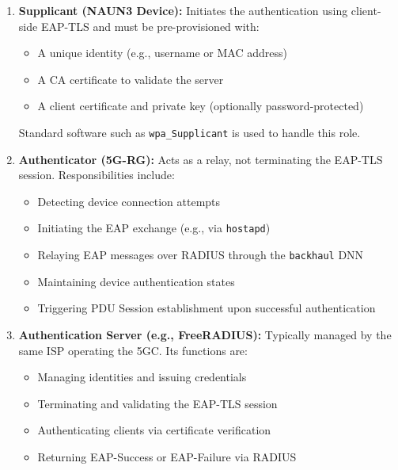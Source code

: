 \begin{enumerate}
    \item {
        \textbf{Supplicant (NAUN3 Device):} Initiates the authentication using client-side \ac{EAP-TLS} and must be pre-provisioned with:
        \begin{itemize}
            \item A unique identity (e.g., username or \ac{MAC} address)
            \item A \ac{CA} certificate to validate the server
            \item A client certificate and private key (optionally password-protected)
        \end{itemize}
        Standard software such as \texttt{wpa\_Supplicant} is used to handle this role.
    }
    \item {
        \textbf{Authenticator (5G-RG):} Acts as a relay, not terminating the \ac{EAP-TLS} session. Responsibilities include:
        \begin{itemize}
            \item Detecting device connection attempts
            \item Initiating the \ac{EAP} exchange (e.g., via \texttt{hostapd})
            \item Relaying \ac{EAP} messages over \ac{RADIUS} through the \texttt{backhaul} \ac{DNN}
            \item Maintaining device authentication states
            \item Triggering \ac{PDU} Session establishment upon successful authentication
        \end{itemize}
    }
    \item {
        \textbf{Authentication Server (e.g., FreeRADIUS):} Typically managed by the same \ac{ISP} operating the \ac{5GC}. Its functions are:
        \begin{itemize}
            \item Managing identities and issuing credentials
            \item Terminating and validating the \ac{EAP-TLS} session
            \item Authenticating clients via certificate verification
            \item Returning \ac{EAP}-Success or \ac{EAP}-Failure via \ac{RADIUS}
        \end{itemize}
    }
\end{enumerate}

